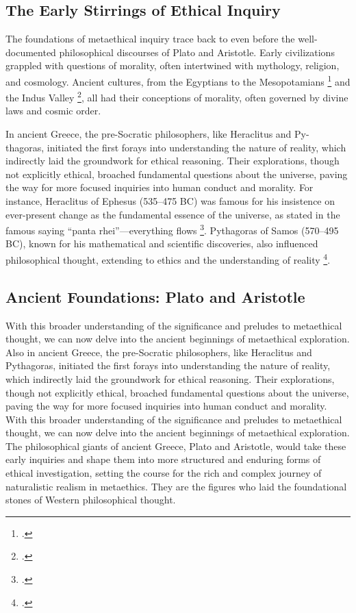 \documentclass[12pt,a4paper]{article}
\begin{document}
\subsection{The Early Stirrings of Ethical Inquiry}
The foundations of metaethical inquiry trace back to even before the well-documented philosophical discourses of Plato and Aristotle. Early civilizations grappled with questions of morality, often intertwined with mythology, religion, and cosmology. Ancient cultures, from the Egyptians to the Mesopotamians \footcite{Frankfort1948} and the Indus Valley \footcite[86-92]{Dales1962}, all had their conceptions of morality, often governed by divine laws and cosmic order.

In ancient Greece, the pre-Socratic philosophers, like Heraclitus and Py- thagoras, initiated the first forays into understanding the nature of reality, which indirectly laid the groundwork for ethical reasoning. Their explorations, though not explicitly ethical, broached fundamental questions about the universe, paving the way for more focused inquiries into human conduct and morality. For instance, Heraclitus of Ephesus (535–475 BC) was famous for his insistence on ever-present change as the fundamental essence of the universe, as stated in the famous saying “panta rhei”—everything flows \footcite[12-16]{Hessel2018}. Pythagoras of Samos (570–495 BC), known for his mathematical and scientific discoveries, also influenced philosophical thought, extending to ethics and the understanding of reality \footcite[111-121]{Lambek1981}.


\subsection{Ancient Foundations: Plato and Aristotle}
With this broader understanding of the significance and preludes to metaethical thought, we can now delve into the ancient beginnings of metaethical exploration. Also in ancient Greece, the pre-Socratic philosophers, like Heraclitus and Pythagoras, initiated the first forays into understanding the nature of reality, which indirectly laid the groundwork for ethical reasoning. Their explorations, though not explicitly ethical, broached fundamental questions about the universe, paving the way for more focused inquiries into human conduct and morality. With this broader understanding of the significance and preludes to metaethical thought, we can now delve into the ancient beginnings of metaethical exploration. The philosophical giants of ancient Greece, Plato and Aristotle, would take these early inquiries and shape them into more structured and enduring forms of ethical investigation, setting the course for the rich and complex journey of naturalistic realism in metaethics. They are the figures who laid the foundational stones of Western philosophical thought. 
\end{document}
